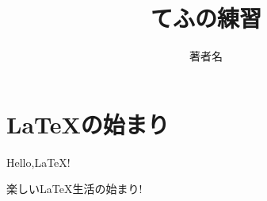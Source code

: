 \documentclass[a4paper]{jsarticle}
\title{てふの練習}
\author{著者名}
\begin{document}
\maketitle
\section{\LaTeX の始まり}
Hello,\LaTeX !

楽しい\LaTeX 生活の始まり!

\end{document}
